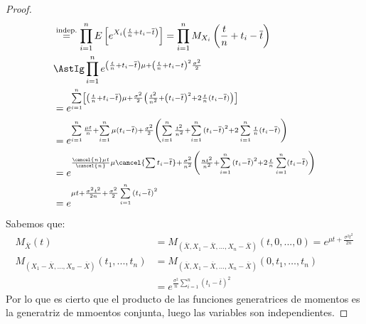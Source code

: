 \begin{prop}
\begin{proof}
\begin{align*}
                                                                                                 &\stackrel{\text{indep.}}{=} \prod_{i=1}^{n} E\left[e^{X_i\left(\frac{t}{n}+t_i - \overline{t}\right)}\right] = \prod_{i=1}^{n} M_{X_i}\left(\frac{t}{n}+t_i - \overline{t}\right) \\
                                                                                                 &\AstIg \prod_{i=1}^{n} e^{\left(\frac{t}{n}+t_i-\overline{t}\right)\mu + {\left(\frac{t}{n}+t_i - t\right)}^{2}\frac{\sigma^2}{2}} \\
                                                                                                 &=e ^{\sum\limits_{i=1}^n \left[\left(\frac{t}{n}+t_i - \overline{t}\right)\mu + \frac{\sigma^2}{2} \left(\frac{t^2}{n^2} + {\left(t_i - \overline{t}\right)}^{2} + 2\frac{t}{n}(t_i - \overline{t})\right)\right]}  \\
                                                                                                 &= e^{\sum\limits_{i=1}^n \frac{\mu t}{n} + \sum\limits_{i=1}^n \mu (t_i-\overline{t}) + \frac{\sigma^2}{2}\left(\sum\limits_{i=1}^n \frac{t^2}{n^2} + \sum\limits_{i=1}^n {(t_i - \overline{t})}^{2} + 2\sum\limits_{i=1}^n \frac{t}{n}(t_i - \overline{t}) \right)} \\
                                                                                                 &= e^{\frac{\cancel{n}\mu t}{\cancel{n}} \mu \cancel{\sum\limits{t_i - \overline{t}}} + \frac{\sigma^2}{n^2} \left(\frac{nt^2}{n^2} + \sum\limits_{i=1}^n {(t_i - \overline{t})}^{2} + 2\frac{t}{n}\sum\limits_{i=1}^n (t_i - \overline{t})\right)} \\
                                                                                                 &= e^{\mu t + \frac{\sigma^2t^2}{2n} + \frac{\sigma^2}{2}\sum\limits_{i=1}^n {(t_i - \overline{t})}^2{}}
        \end{align*}
        Sabemos que:
        \begin{align*}
            M_{\overline{X}}(t) &= M_{\left(\overline{X},X_1 - \overline{X}, \ldots, X_n - \overline{X}\right)}(t,0, ..., 0) = e^{\mu t + \frac{\sigma^2t^2}{2n}} \\
            M_{(X_1 - \overline{X}, \ldots, X_n - \overline{X})}(t_1, ..., t_n) &= M_{(\overline{X},X_1 - \overline{X}, \ldots, X_n - \overline{X})}(0,t_1, \ldots, t_n) \\
                                &= e^{\frac{\sigma^2}{n}\sum\limits_{i=1}^n {(t_i - \overline{t})}^{2}}
        \end{align*}
        Por lo que es cierto que el producto de las funciones generatrices de momentos es la generatriz de mmoentos conjunta, luego las variables son independientes.
    \end{proof}
\end{prop}

